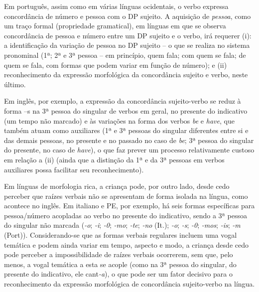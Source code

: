 \documentclass[output=paper]{LSP/langsci}
\begin{document}
Em português, assim como em várias línguas ocidentais, o verbo expressa concordância de número e pessoa com o DP sujeito. A aquisição de \textit{pessoa}, como um traço formal (propriedade gramatical), em línguas em que se observa concordância de pessoa e número entre um DP sujeito e o verbo, irá requerer (i):  a identificação da variação de pessoa no DP sujeito – o que se realiza no sistema pronominal (1ª; 2ª e 3ª pessoa – em princípio, quem fala; com quem se fala; de quem se fala, com formas que podem variar em função de número); e (ii) reconhecimento da expressão morfológica da concordância sujeito e verbo, neste último. 

Em inglês, por exemplo, a expressão da concordância sujeito-verbo se reduz à forma –s na 3ª pessoa do singular de verbos em geral, no presente do indicativo (um tempo não marcado) e às variações na forma dos verbos \textit{be} e \textit{have}, que também atuam como auxiliares (1ª e 3ª pessoas do singular diferentes entre si e das demais pessoas, no presente e no passado no caso de \textit{be}; 3ª pessoa do singular do presente, no caso de \textit{have}), o que faz prever um processo relativamente custoso em relação a (ii) (ainda que a distinção da 1ª e da 3ª pessoas em verbos auxiliares possa facilitar seu reconhecimento).

Em línguas de morfologia rica, a criança pode, por outro lado, desde cedo perceber que raízes verbais não se apresentam de forma isolada na língua, como acontece no inglês. Em italiano e PE, por exemplo, há seis formas específicas para pessoa/número acopladas ao verbo no presente do indicativo, sendo a 3ª pessoa do singular não marcada (\textit{-o}; \textit{-i}; \textit{-0}; \textit{-mo}; \textit{-te}; \textit{-no} (It.); \textit{-o}; \textit{-s}; \textit{-0}; \textit{-mos}; \textit{-is}; \textit{-m} (Port)). Considerando-se que as formas verbais regulares incluem uma vogal temática e podem ainda variar em tempo, aspecto e modo, a criança desde cedo pode perceber a impossibilidade de raízes verbais ocorrerem, sem que, pelo menos, a vogal temática a esta se acople (como na 3ª pessoa do singular, do presente do indicativo, ele cant\textit{-a}), o que pode ser um fator decisivo para o reconhecimento da expressão morfológica de concordância sujeito-verbo na língua. 
\end{document}

